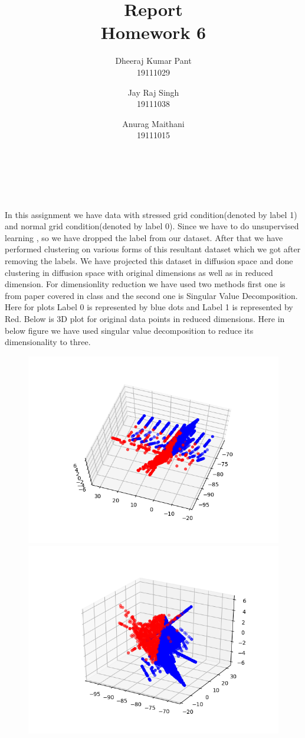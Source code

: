\documentclass[12pt]{scrartcl}
\title{Report\\Homework 6}
\author{Dheeraj Kumar Pant\\19111029 \and Jay Raj Singh\\19111038 \and Anurag Maithani\\19111015}
\begin{document}
\maketitle
\hfill \break
\\
\\
\\
In this assignment we have data with stressed grid condition(denoted by label 1) and normal grid condition(denoted by label 0). Since we have to do unsupervised learning , so we have dropped the label from our dataset. After that we have performed clustering on various forms of this resultant dataset which we got after removing the labels. We have projected this dataset in diffusion space and  done clustering in diffusion space with original dimensions as well as in reduced dimension. For dimensionlity reduction we have used two methods first one is from paper covered in class and the second one is Singular Value Decomposition. Here for plots Label 0 is represented by blue dots and Label 1 is represented by Red. Below is 3D plot for original data points in reduced dimensions. Here in below figure we have used singular value decomposition to reduce its dimensionality to three. 
\begin{figure}[h]
    		\includegraphics[scale=0.5]{Original_data_.png}
    		\includegraphics[scale=0.5]{Original_data.png}
    		
\end{figure}
\end{document}
